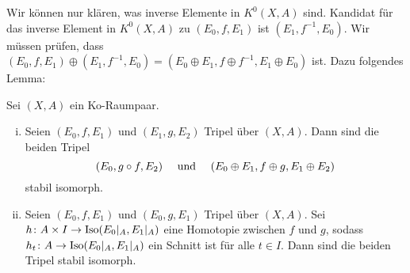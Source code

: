 Wir können nur klären, was inverse Elemente in $K^0(X,A)$ sind. Kandidat für das inverse Element in $K^0(X,A)$ zu $(E_0,f,E_1)$ ist $(E_1, f ^{-1},E_0)$. Wir müssen
prüfen, dass $(E_0,f,E_1) \oplus (E_1,f ^{-1}, E_0)= (E_0 \oplus E_1, f \oplus  f ^{-1},E_1 \oplus E_0)$ ist. Dazu folgendes Lemma:

\begin{lemma}[label=sub:34]
Sei $(X,A)$ ein Ko-Raumpaar.
\begin{enumerate}[(i)]
	\item Seien $(E_0,f,E_1)$ und $(E_1,g,E_2)$ Tripel über $(X,A)$. Dann sind die beiden Tripel 
	\[
		(E_0,g \circ f, E_2) \quad  \text{ und } \quad \enbrace*{E_0 \oplus E_1, f \oplus g, E_1 \oplus E_2} 
	\]
	stabil isomorph.
	\item Seien $(E_0,f,E_1)$ und $(E_0,g,E_1)$ Tripel über $(X,A)$. Sei $h \colon A \times I \to \Iso \enbrace*{E_0|_A,E_1|_A} $ eine Homotopie zwischen $f$ und $g$, sodass 
	$h_t \colon A \to \Iso \enbrace*{E_0|_A,E_1|_A}$ ein Schnitt ist für alle $t \in I$. Dann sind die beiden Tripel stabil isomorph.
\end{enumerate}
\end{lemma}
